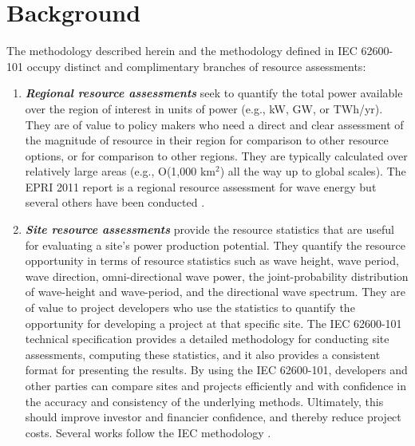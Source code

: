 \section{Background}
\label{sec:background}

The methodology described herein and the methodology defined in IEC 62600-101 occupy distinct and complimentary branches of resource assessments:
\begin{enumerate}
\item {\bf \em Regional resource assessments} seek to quantify the total power available over the region of interest in units of power (e.g., kW, GW, or TWh/yr). 
They are of value to policy makers who need a direct and clear assessment of the magnitude of resource in their region for comparison to other resource options, or for comparison to other regions. They are typically calculated over relatively large areas (e.g., O(1,000 km$^2$) all the way up to global scales). The EPRI 2011 report is a regional resource assessment for wave energy \citep[][]{EPRIwaveresource2011} but several others have been conducted \citep[e.g., ][]{gunnQuantifyingGlobalWave2012,regueroGlobalWavePower2015,motaWaveEnergyPotential2014}.
\item {\bf \em Site resource assessments} provide the resource statistics that are useful for evaluating a site’s power production potential. They quantify the resource opportunity in terms of resource statistics such as wave height, wave period, wave direction, omni-directional wave power, the joint-probability distribution of wave-height and wave-period, and the directional wave spectrum. They are of value to project developers who use the statistics to quantify the opportunity for developing a project at that specific site. The IEC 62600-101 technical specification provides a detailed methodology for conducting site assessments, computing these statistics, and it also provides a consistent format for presenting the results. By using the IEC 62600-101, developers and other parties can compare sites and projects efficiently and with confidence in the accuracy and consistency of the underlying methods. Ultimately, this should improve investor and financier confidence, and thereby reduce project costs. Several works follow the IEC methodology \citep[e.g., ][]{zhengAssessingChinaSea2013, neillWavePowerVariability2013, sierraWaveEnergyResource2013, robertsonCharacterizingShoreWave2014, yangCharacteristicsVariabilityNearshore2020, lokuliyana_sri_2020, garcia-medina_wave_2021}.
\end{enumerate}

